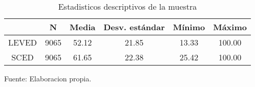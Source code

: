 \begin{table}[H]
\centering
\begin{tabular}{c|c|c|c|c|c|}
\cline{2-6}
                                & N    & Media & Desv. estándar & Mínimo & Máximo \\ \hline
\multicolumn{1}{|c|}{LEVED} & 9065 & 52.12 & 21.85          & 13.33   & 100.00 \\ \hline
\multicolumn{1}{|c|}{SCED}      & 9065 & 61.65 & 22.38          & 25.42  & 100.00 \\ \hline
\end{tabular}
\caption{Estadisticos descriptivos de la muestra}
Fuente: Elaboracion propia.
\label{DescTable}
\end{table}
